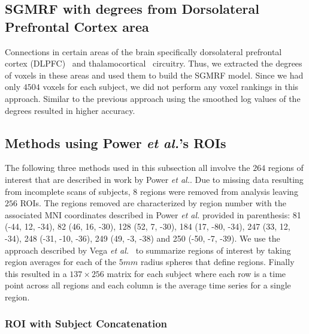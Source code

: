 \documentclass{article} %
\begin{document}
\subsection{SGMRF with degrees from Dorsolateral Prefrontal Cortex area}
Connections in certain areas of the brain specifically dorsolateral 
prefrontal cortex (DLPFC)~\cite{Potkin2008} and 
thalamocortical~\cite{Cheng2015} circuitry. Thus, we extracted the degrees 
of voxels in these areas and used them to build the SGMRF model. Since we 
had only $4504$ voxels for each subject, we did not perform any voxel 
rankings in this approach. Similar to the previous approach using the 
smoothed log values of the degrees resulted in higher accuracy.

\subsection{Methods using Power \emph{et al.}'s ROIs}

The following three methods used in this subsection all involve the $264$  
regions of interest that are described in work by Power \emph{et al.}.
Due to missing data resulting from incomplete scans of subjects, $8$
regions were removed from analysis leaving $256$ ROIs. The regions removed
are characterized by region number with the associated MNI coordinates 
described in Power \emph{et al.} provided in parenthesis: 81 (-44, 12, -34), 
82 (46, 16, -30), 128 (52, 7, -30), 184 (17, -80, -34), 247 (33, 12, -34), 
248 (-31, -10, -36), 249 (49, -3, -38) and 250 (-50, -7, -39). We use the
approach described by Vega \emph{et al.}~\cite{rvega} to summarize
regions of interest by taking region averages for each of the $5mm$ radius
spheres that define regions. Finally this resulted in a $137 \times 256$ matrix
for each subject where each row is a time point across all regions and each
column is the average time series for a single region.


\subsubsection{ROI with Subject Concatenation}
\end{document}

